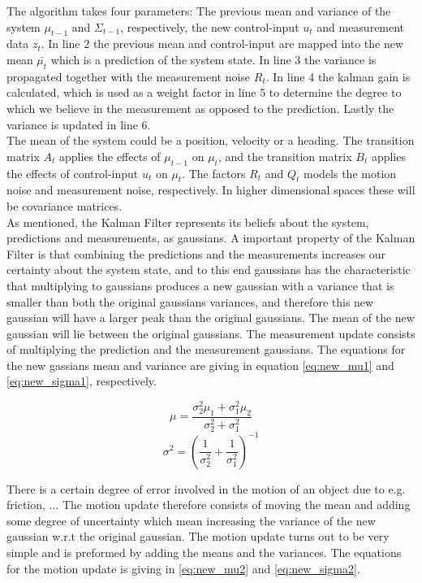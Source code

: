 The algorithm takes four parameters: The previous mean and variance of the system $\mu_{t-1}$ and $\Sigma_{t-1}$, respectively, the new control-input $u_{t}$ and measurement data $z_{t}$. In line 2 the previous mean and control-input are mapped into the new mean $\bar{\mu_{t}}$ which is a prediction of the system state. In line 3 the variance is propagated together with the measurement noise $R_{t}$. In line 4 the kalman gain is calculated, which is used as a weight factor in line 5 to determine the degree to which we believe in the measurement as opposed to the prediction. Lastly the variance is updated in line 6.\\

The mean of the system could be a position, velocity or a heading. The transition matrix $A_{t}$ applies the effects of $\mu_{t-1}$ on $\mu_{t}$, and the transition matrix $B_{t}$ applies the effects of control-input $u_{t}$ on $\mu_{t}$. The factors $R_{t}$ and $Q_{t}$ models the motion noise and measurement noise, respectively. In higher dimensional spaces these will be covariance matrices.\\

As mentioned, the Kalman Filter represents its beliefs about the system, predictions and measurements, as gaussians. A important property of the Kalman Filter is that combining the predictions and the measurements increases our certainty about the system state, and to this end gaussians has the characteristic that multiplying to gaussians produces a new gaussian with a variance that is smaller than both the original gaussians variances, and therefore this new gaussian will have a larger peak than the original gaussians. The mean of the new gaussian will lie between the original gaussians.
The measurement update consists of multiplying the prediction and the measurement gaussians. The equations for the new gassians mean and variance are giving in equation \ref{eq:new_mu1} and \ref{eq:new_sigma1}, respectively.

\begin{equation}
\label{eq:new_mu1}
\mu = \dfrac{\sigma_{2}^2\mu_{1} + \sigma_{1}^2\mu_{2}}{\sigma_{2}^2 + \sigma_{1}^2}
\end{equation}
\begin{equation}
\label{eq:new_sigma1}
\sigma^2 = (\dfrac{1}{\sigma_{2}^2} + \dfrac{1}{\sigma_{1}^2})^{-1}
\end{equation}

There is a certain degree of error involved in the motion of an object due to e.g. friction, ... The motion update therefore consists of moving the mean and adding some degree of uncertainty which mean increasing the variance of the new gaussian w.r.t the original gaussian. The motion update turns out to be very simple and is preformed by adding the means and the variances. The equations for the motion update is giving in \ref{eq:new_mu2} and \ref{eq:new_sigma2}.


